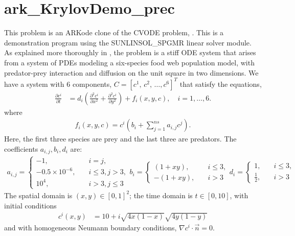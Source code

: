 \documentclass[letterpaper,10pt,english]{sphinxmanual}
\begin{document}
\section{ark\_KrylovDemo\_prec}
\label{\detokenize{c_serial:id30}}\label{\detokenize{c_serial:ark-krylovdemo-prec}}
This problem is an ARKode clone of the CVODE problem,
.  This is a demonstration program using the
SUNLINSOL\_SPGMR linear solver module.  As explained more thoroughly in
\label{\detokenize{c_serial:id31}}{\hyperref[\detokenize{References:hsr2017}]{\sphinxcrossref{{[}HSR2017{]}}}}, the problem is a stiff ODE system that arises from a
system of PDEs modeling a six-species food web population model, with
predator-prey interaction and diffusion on the unit square in two
dimensions.  We have a system with 6 components, \(C = [c^1,\,
c^2,\,\ldots, c^6]^T\) that satisfy the equations,
\begin{equation*}
\begin{split}\frac{\partial c^i}{\partial t} &= d_i \left(\frac{\partial^2 c^i}{\partial
   x^2} + \frac{\partial^2 c^i}{\partial y^2}\right) +
   f_i(x,y,c),\quad i=1,\ldots,6.\end{split}
\end{equation*}
where
\begin{equation*}
\begin{split}f_i(x,y,c) = c^i\left( b_i + \sum_{j=1}^{ns} a_{i,j} c^j\right).\end{split}
\end{equation*}
Here, the first three species are prey and the last three are
predators.  The coefficients \(a_{i,j}, b_i, d_i\) are:
\begin{equation*}
\begin{split}a_{i,j} = \begin{cases}
            -1, \quad & i=j,\\
            -0.5\times10^{-6}, \quad & i\le 3, j>3, \\
             10^4, \quad & i>3, j\le3
          \end{cases}
b_i = \begin{cases}
         (1+xy), \quad & i\le 3,\\
        -(1+xy), \quad & i>3
      \end{cases}
d_i = \begin{cases}
         1, \quad & i\le 3,\\
         \frac12, \quad & i>3
      \end{cases}\end{split}
\end{equation*}
The spatial domain is \((x,y) \in [0, 1]^2\); the time domain is
\(t \in [0,10]\), with initial conditions
\begin{equation*}
\begin{split}c^i(x,y) &=  10 + i \sqrt{4x(1-x)}\sqrt{4y(1-y)}\end{split}
\end{equation*}
and with homogeneous Neumann boundary conditions,
\(\nabla c^i \cdot \vec{n} = 0\).
\end{document}
